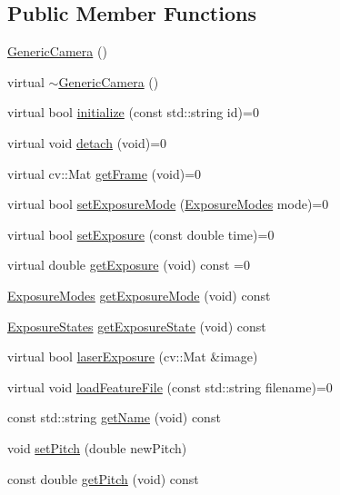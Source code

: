 \subsection*{Public Member Functions}
\begin{DoxyCompactItemize}
\item 
\hyperlink{class_generic_camera_ace942cddd443bb28aeee5e49b10aa374}{Generic\+Camera} ()
\item 
virtual \hyperlink{class_generic_camera_a8a523a465c0db18b59b6113c6d308962}{$\sim$\+Generic\+Camera} ()
\item 
virtual bool \hyperlink{class_generic_camera_ad050957bbb8003fc55f4656d43347f1e}{initialize} (const std\+::string id)=0
\item 
virtual void \hyperlink{class_generic_camera_a86a91e987d6142e5417b2c07542e0aa4}{detach} (void)=0
\item 
virtual cv\+::\+Mat \hyperlink{class_generic_camera_abeaa74ba34179da70ec2c4bbb9b0d793}{get\+Frame} (void)=0
\item 
virtual bool \hyperlink{class_generic_camera_a5c3bd3ca0d691cf9026f8c91b3cf7c66}{set\+Exposure\+Mode} (\hyperlink{constants_8h_a6e920987695b1da6e2df4e41dc867e18}{Exposure\+Modes} mode)=0
\item 
virtual bool \hyperlink{class_generic_camera_a62365678e9254bde587de4a50ffb7887}{set\+Exposure} (const double time)=0
\item 
virtual double \hyperlink{class_generic_camera_ae3fe4b50577c854037b7a77dade27487}{get\+Exposure} (void) const =0
\item 
\hyperlink{constants_8h_a6e920987695b1da6e2df4e41dc867e18}{Exposure\+Modes} \hyperlink{class_generic_camera_afdd27d857471c1bca22f10520ef28a35}{get\+Exposure\+Mode} (void) const
\item 
\hyperlink{constants_8h_ae9749bac8d6973b92725af092d0a76bc}{Exposure\+States} \hyperlink{class_generic_camera_a31369d7e310827a9ac3b4366ddcbf22e}{get\+Exposure\+State} (void) const
\item 
virtual bool \hyperlink{class_generic_camera_ad20a7c33465d6791563f77a637ceed83}{laser\+Exposure} (cv\+::\+Mat \&image)
\item 
virtual void \hyperlink{class_generic_camera_a393e01ba0b1bc18ad43f00cc62ccea4e}{load\+Feature\+File} (const std\+::string filename)=0
\item 
const std\+::string \hyperlink{class_generic_camera_a7f97060cc4089fb4d8834ce8c055a561}{get\+Name} (void) const
\item 
void \hyperlink{class_generic_camera_aae87f93ed0741bbfa4881f551cd1a73c}{set\+Pitch} (double new\+Pitch)
\item 
const double \hyperlink{class_generic_camera_a429fbb0069ed11630ba5284235563f87}{get\+Pitch} (void) const
\end{DoxyCompactItemize}
